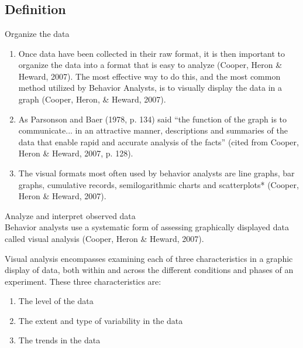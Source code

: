 \section{\fouriFive{}}
\subsection{Definition}
Organize the data
\begin{enumerate}
\item Once data have been collected in their raw format, it is then important to organize the data into a format that is easy to analyze (Cooper, Heron \& Heward, 2007). The most effective way to do this, and the most common method utilized by Behavior Analysts, is to visually display the data in a graph (Cooper, Heron, \& Heward, 2007).
\item As Parsonson and Baer (1978, p. 134) said ``the function of the graph is to communicate... in an attractive manner, descriptions and summaries of the data that enable rapid and accurate analysis of the facts'' (cited from Cooper, Heron \& Heward, 2007, p. 128).
\item The visual formats most often used by behavior analysts are line graphs, bar graphs, cumulative records, semilogarithmic charts and scatterplots* (Cooper, Heron \& Heward, 2007).
\end{enumerate}
%
Analyze and interpret observed data\\

Behavior analysts use a systematic form of assessing graphically displayed data called visual analysis (Cooper, Heron \& Heward, 2007). 

Visual analysis encompasses examining each of three characteristics in a graphic display of data, both within and across the different conditions and phases of an experiment. These three characteristics are:

\begin{enumerate}
\item The level of the data
\item The extent and type of variability in the data 
\item The trends in the data
\end{enumerate}

